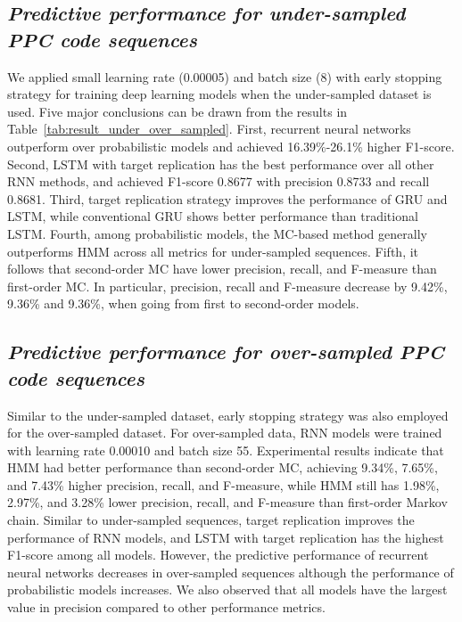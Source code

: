 \documentclass{amia_summit_2018}
\begin{document}
\subsection*{\textit{Predictive performance for under-sampled PPC code sequences}}
We applied small learning rate (0.00005) and batch size (8) with early stopping strategy for training deep learning models when the under-sampled dataset is used. Five major conclusions can be drawn from the results in Table~\ref{tab:result_under_over_sampled}. First, recurrent neural networks outperform over probabilistic models and achieved 16.39\%-26.1\% higher F1-score. Second, LSTM with target replication has the best performance over all other RNN methods, and achieved F1-score 0.8677 with precision 0.8733 and recall 0.8681. Third, target replication strategy improves the performance of GRU and LSTM, while conventional GRU shows better performance than traditional LSTM. Fourth, among probabilistic models, the MC-based method generally outperforms HMM across all metrics for under-sampled sequences. Fifth, it follows that second-order MC have lower precision, recall, and F-measure than first-order MC. In particular, precision, recall and F-measure decrease by 9.42\%, 9.36\% and 9.36\%, when going from first to second-order models.

\subsection*{\textit{Predictive performance for over-sampled PPC code sequences}}
Similar to the under-sampled dataset, early stopping strategy was also employed for the over-sampled dataset. For over-sampled data, RNN models were trained with learning rate 0.00010 and batch size 55. Experimental results indicate that HMM had better performance than second-order MC, achieving 9.34\%, 7.65\%, and 7.43\% higher precision, recall, and F-measure, while HMM still has 1.98\%, 2.97\%, and 3.28\% lower precision, recall, and F-measure than first-order Markov chain. Similar to under-sampled sequences, target replication improves the performance of RNN models, and LSTM with target replication has the highest F1-score among all models. However, the predictive performance of recurrent neural networks decreases in over-sampled sequences although the performance of probabilistic models increases. We also observed that all models have the largest value in precision compared to other performance metrics.
\end{document}
